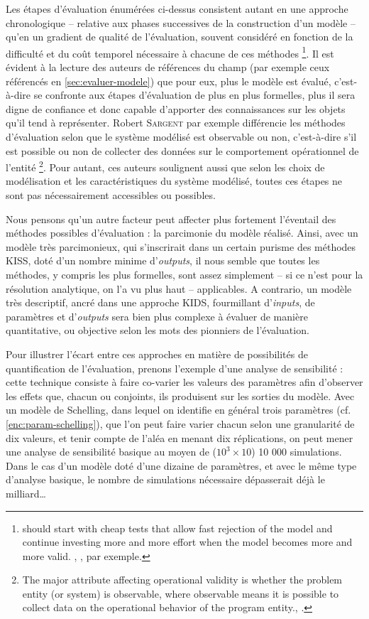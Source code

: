 Les étapes d'évaluation énumérées ci-dessus consistent autant en une approche chronologique -- relative aux phases successives de la construction d'un modèle -- qu'en un gradient de qualité de l'évaluation, souvent considéré en fonction de la difficulté et du coût temporel nécessaire à chacune de ces méthodes
\footnote{
	\og [One] should start with cheap tests that allow fast rejection of the model and continue investing more and more effort when the model becomes more and more valid. \fg{}, \textcite[42]{klugl_validation_2008}, par exemple.
}.
Il est évident à la lecture des auteurs de références du champ (par exemple ceux référencés en \cref{sec:evaluer-modele}) que pour eux, \og plus\fg{} le modèle est évalué, c'est-à-dire se confronte aux étapes d'évaluation de plus en plus formelles, plus il sera digne de confiance et donc capable d'apporter des connaissances sur les objets qu'il tend à représenter.
Robert \textsc{Sargent} par exemple différencie les méthodes d'évaluation selon que le système modélisé est observable ou non, c'est-à-dire \og s'il est possible ou non de collecter des données sur le comportement opérationnel de l'entité \fg{}
\footnote{
	\og The major attribute affecting operational validity is whether the problem entity (or system) is observable, where observable means it is possible to collect data on the operational behavior of the program entity.\fg{}, \textcite[6]{sargent2009verification}.
}.
Pour autant, ces auteurs soulignent aussi que selon les choix de modélisation et les caractéristiques du système modélisé, toutes ces étapes ne sont pas nécessairement accessibles ou possibles.

Nous pensons qu'un autre facteur peut affecter plus fortement l'éventail des méthodes possibles d'évaluation : la parcimonie du modèle réalisé.
Ainsi, avec un modèle très parcimonieux, qui s'inscrirait dans un certain purisme des méthodes \og KISS\fg{}, doté d'un nombre minime d'\textit{outputs}, il nous semble que toutes les méthodes, y compris les plus formelles, sont assez simplement -- si ce n'est pour la résolution analytique, on l'a vu plus haut -- applicables.
A contrario, un modèle très descriptif, ancré dans une approche \og KIDS\fg{}, fourmillant d'\textit{inputs}, de paramètres et d'\textit{outputs} sera bien plus complexe à évaluer de manière quantitative, ou \og objective\fg{} selon les mots des pionniers de l'évaluation.

Pour illustrer l'écart entre ces approches en matière de possibilités de quantification de l'évaluation, prenons l'exemple d'une analyse de sensibilité :
	cette technique consiste à faire co-varier les valeurs des paramètres afin d'observer les effets que, chacun ou conjoints, ils produisent sur les sorties du modèle.
Avec un modèle de Schelling, dans lequel on identifie en général trois paramètres (cf. \cref{enc:param-schelling}), que l'on peut faire varier chacun selon une granularité de dix valeurs, et tenir compte de l'aléa en menant dix réplications, on peut mener une analyse de sensibilité basique au moyen de ($10^3 \times 10$) 10 000 simulations.
Dans le cas d'un modèle doté d'une dizaine de paramètres, et avec le même type d'analyse basique, le nombre de simulations nécessaire dépasserait déjà le milliard\ldots

